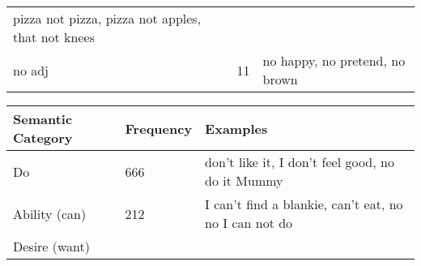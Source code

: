 \documentclass[man]{apa6}
\begin{document}
\begin{longtable}[]{@{}lll@{}}
\begin{minipage}[t]{0.47\columnwidth}
pizza not pizza, pizza not apples, that not knees\strut
\end{minipage}\tabularnewline
\begin{minipage}[t]{0.23\columnwidth}\raggedright\strut
no adj\strut
\end{minipage} & \begin{minipage}[t]{0.15\columnwidth}\raggedright\strut
11\strut
\end{minipage} & \begin{minipage}[t]{0.47\columnwidth}\raggedright\strut
no happy, no pretend, no brown\strut
\end{minipage}\tabularnewline
\bottomrule
\end{longtable}

\begin{longtable}[]{@{}lll@{}}
\toprule
\begin{minipage}[b]{0.27\columnwidth}\raggedright\strut
Semantic Category\strut
\end{minipage} & \begin{minipage}[b]{0.16\columnwidth}\raggedright\strut
Frequency\strut
\end{minipage} & \begin{minipage}[b]{0.39\columnwidth}\raggedright\strut
Examples\strut
\end{minipage}\tabularnewline
\midrule
\endhead
\begin{minipage}[t]{0.27\columnwidth}\raggedright\strut
Do\strut
\end{minipage} & \begin{minipage}[t]{0.16\columnwidth}\raggedright\strut
666\strut
\end{minipage} & \begin{minipage}[t]{0.39\columnwidth}\raggedright\strut
don't like it, I don't feel good, no do it Mummy\strut
\end{minipage}\tabularnewline
\begin{minipage}[t]{0.27\columnwidth}\raggedright\strut
Ability (can)\strut
\end{minipage} & \begin{minipage}[t]{0.16\columnwidth}\raggedright\strut
212\strut
\end{minipage} & \begin{minipage}[t]{0.39\columnwidth}\raggedright\strut
I can't find a blankie, can't eat, no no I can not do\strut
\end{minipage}\tabularnewline
\begin{minipage}[t]{0.27\columnwidth}\raggedright\strut
Desire (want)\strut

\end{minipage}
\end{longtable}
\end{document}
